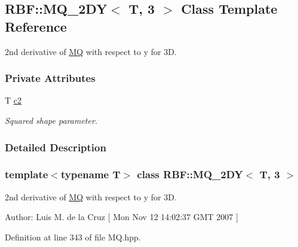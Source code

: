 \hypertarget{classRBF_1_1MQ__2DY_3_01T_00_013_01_4}{
\subsection{RBF::MQ\_\-2DY$<$ T, 3 $>$ Class Template Reference}
\label{classRBF_1_1MQ__2DY_3_01T_00_013_01_4}
}
2nd derivative of \hyperlink{classRBF_1_1MQ}{MQ} with respect to y for 3D.  


\subsubsection*{Private Attributes}
\begin{CompactItemize}
\item 
\hypertarget{classRBF_1_1MQ__2DY_3_01T_00_013_01_4_c46d5d2e81d52cfbdda65a14847195e3}{
T \hyperlink{classRBF_1_1MQ__2DY_3_01T_00_013_01_4_c46d5d2e81d52cfbdda65a14847195e3}{c2}}
\label{classRBF_1_1MQ__2DY_3_01T_00_013_01_4_c46d5d2e81d52cfbdda65a14847195e3}

\begin{CompactList}\small\item\em Squared shape parameter. \item\end{CompactList}\end{CompactItemize}


\subsubsection{Detailed Description}
\subsubsection*{template$<$typename T$>$ class RBF::MQ\_\-2DY$<$ T, 3 $>$}

2nd derivative of \hyperlink{classRBF_1_1MQ}{MQ} with respect to y for 3D. 

\begin{Desc}
\item[Author:]Luis M. de la Cruz \mbox{[} Mon Nov 12 14:02:37 GMT 2007 \mbox{]} \end{Desc}


Definition at line 343 of file MQ.hpp.